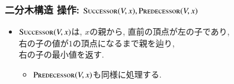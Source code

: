 \documentclass[main]{subfiles}
\begin{document}
\begin{frame}\frametitle{二分木構造 操作: {\small $\mathrm{\text{S\textsc{uccessor}}}(V,x), \mathrm{\text{P\textsc{redecessor}}}(V,x)$}}
\begin{itemize}
\item $\mathrm{\text{S\textsc{uccessor}}}(V,x)$は, $x$の親から, 直前の頂点が左の子であり, \\右の子の値が$1$の頂点になるまで親を辿り, \\右の子の最小値を返す. 
\begin{itemize}
\item $\mathrm{\text{P\textsc{redecessor}}}(V,x)$も同様に処理する.
\end{itemize}
\end{itemize}
 

\end{frame}
\end{document}
